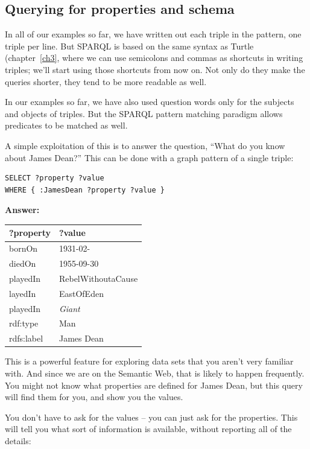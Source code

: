 \subsection{Querying for properties and schema}

In all of our examples so far, we have written out each triple in the pattern, one triple per line.  
But SPARQL is based on the same syntax as Turtle (chapter~\ref{ch3}, where we can use semicolons and commas as shortcuts
in writing triples; we'll start using those shortcuts from now on.  Not only do they make the queries shorter, they
tend to be more readable as well. 

In our examples so far, 
we have also used question words only for the
subjects and objects of triples. But the SPARQL pattern matching
paradigm allows predicates to be matched as well.

A simple exploitation of this is to answer the question, ``What do you
know about James Dean?'' This can be done with a graph pattern of a
single triple:


\begin{lstlisting}
SELECT ?property ?value
WHERE { :JamesDean ?property ?value }
\end{lstlisting}

\textbf{\textbf{Answer:}}

\begin{tabular}{|ll|}
\hline
?property&?value\\
\hline
bornOn&1931-02-\\
diedOn&1955-09-30\\
playedIn&RebelWithoutaCause\\
layedIn&EastOfEden\\
playedIn&\emph{Giant}\\
rdf:type&Man\\
rdfs:label&James Dean\\
\hline
\end{tabular}


This is a powerful feature for exploring data sets that you aren't very
familiar with. And since we are on the Semantic Web, that is likely to
happen frequently. You might not know what properties are defined for
James Dean, but this query will find them for you, and show you the
values.

You don't have to ask for the values -- you can just ask for the
properties. This will tell you what sort of information is available,
without reporting all of the details:


